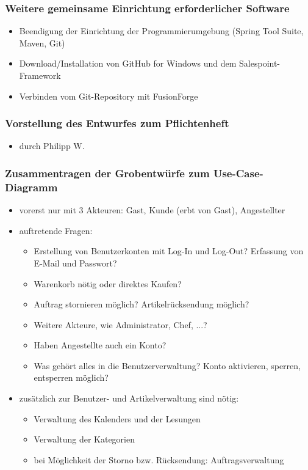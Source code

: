 \documentclass[12pt,a4paper]{article}
\begin{document}
\subsubsection*{Weitere gemeinsame Einrichtung erforderlicher Software}
\begin{itemize}
\item Beendigung der Einrichtung der Programmierumgebung (Spring Tool Suite, Maven, Git)
\item Download/Installation von GitHub for Windows und dem Salespoint-Framework
\item Verbinden vom Git-Repository mit FusionForge
\end{itemize}

\subsubsection*{Vorstellung des Entwurfes zum Pflichtenheft}
\begin{itemize}
\item durch Philipp W.
\end{itemize}

\subsubsection*{Zusammentragen der Grobentwürfe zum Use-Case-Diagramm}
\begin{itemize}
\item vorerst nur mit 3 Akteuren: Gast, Kunde (erbt von Gast), Angestellter
\item auftretende Fragen:
\begin{itemize}
\item Erstellung von Benutzerkonten mit Log-In und Log-Out? Erfassung von E-Mail und Passwort?
\item Warenkorb nötig oder direktes Kaufen?
\item Auftrag stornieren möglich? Artikelrücksendung möglich?
\item Weitere Akteure, wie Administrator, Chef, ...?
\item Haben Angestellte auch ein Konto?
\item Was gehört alles in die Benutzerverwaltung? Konto aktivieren, sperren, entsperren möglich?
\end{itemize}
\item zusätzlich zur Benutzer- und Artikelverwaltung sind nötig:
\begin{itemize}
\item Verwaltung des Kalenders und der Lesungen
\item Verwaltung der Kategorien
\item bei Möglichkeit der Storno bzw. Rücksendung: Auftragsverwaltung
\end{itemize}
\end{itemize}
\end{document}
